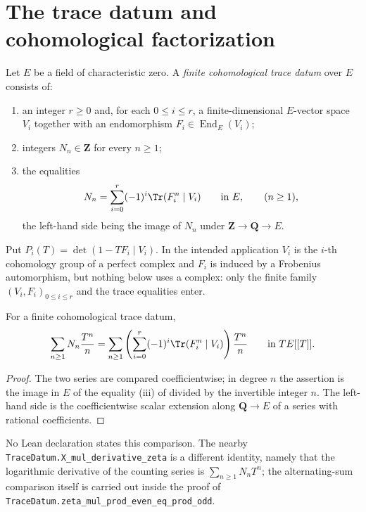 \section{The trace datum and cohomological factorization}
\label{sec:zla-trace-datum}

\begin{definition}
\label{def:zla-trace-datum}
\leanok
Let $E$ be a field of characteristic zero.  A \emph{finite cohomological trace
datum} over $E$ consists of:
\begin{enumerate}[label=\textup{(\roman*)}]
\item an integer $r\geq0$ and, for each $0\leq i\leq r$, a finite-dimensional
      $E$-vector space $V_i$ together with an endomorphism
      $F_i\in\operatorname{End}_E(V_i)$;
\item integers $N_n\in\mathbf Z$ for every $n\geq1$;
\item the equalities
\[
  N_n=\sum_{i=0}^r(-1)^i\Tr(F_i^n\mid V_i)
  \qquad\text{in }E,\qquad(n\geq1),
\]
the left-hand side being the image of $N_n$ under
$\mathbf Z\to\mathbf Q\to E$.
\end{enumerate}
Put $P_i(T)=\det(1-TF_i\mid V_i)$.  In the intended application $V_i$ is the
$i$-th cohomology group of a perfect complex and $F_i$ is induced by a
Frobenius automorphism, but nothing below uses a complex: only the finite
family $(V_i,F_i)_{0\leq i\leq r}$ and the trace equalities enter.
\end{definition}

\begin{lemma}
\label{lem:zla-counting-log}
For a finite cohomological trace datum,
\[
  \sum_{n\geq1}N_n\frac{T^n}{n}
  =\sum_{n\geq1}\left(\sum_{i=0}^r(-1)^i\Tr(F_i^n\mid V_i)\right)\frac{T^n}{n}
  \qquad\text{in }TE[[T]].
\]
\end{lemma}
\begin{proof}
The two series are compared coefficientwise; in degree $n$ the assertion is
the image in $E$ of the equality (iii) of  divided by
the invertible integer $n$.  The left-hand side is the coefficientwise scalar
extension along $\mathbf Q\to E$ of a series with rational coefficients.
\end{proof}

No Lean declaration states this comparison.  The nearby
\texttt{TraceDatum.X\_mul\_derivative\_zeta} is a different identity, namely
that the logarithmic derivative of the counting series is
$\sum_{n\geq1}N_nT^n$; the alternating-sum comparison itself is carried out
inside the proof of
\texttt{TraceDatum.zeta\_mul\_prod\_even\_eq\_prod\_odd}.

